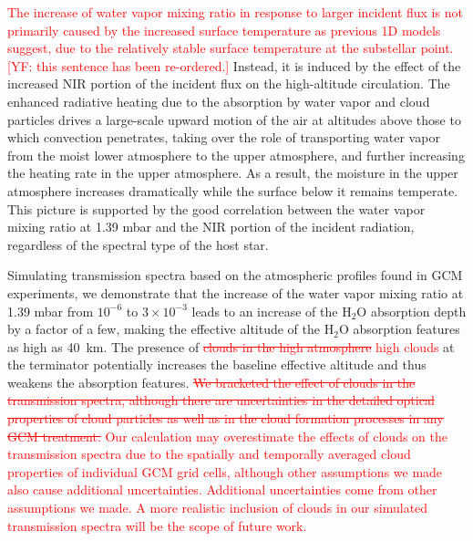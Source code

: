 \documentclass[11pt,numberedappendix,twocolappendix,]{emulateapj}
\def\water{H$_2$O}
\def\preslevel{1.39 mbar}
\def\wv{water vapor}
\def\addYF#1{\textcolor{red}{#1}}
\def\changeYF#1#2{\textcolor{red}{\sout{#1} #2}}
\begin{document}
\addYF{The increase of \wv{} mixing ratio in response to larger incident flux is not primarily caused by the increased surface temperature as previous 1D models suggest, due to the relatively stable surface temperature at the substellar point. }\addYF{[YF: this sentence has been re-ordered.]}
Instead, it is induced by the effect of the increased NIR portion of the incident flux on the high-altitude circulation. 
The enhanced radiative heating due to the absorption by \wv{} and cloud particles drives a large-scale upward motion of the air at altitudes above those to which convection penetrates, taking over the role of transporting \wv{} from the moist lower atmosphere to the upper atmosphere, and further increasing the heating rate in the upper atmosphere.
As a result, the moisture in the upper atmosphere increases dramatically while the surface below it remains temperate. 
This picture is supported by the good correlation between the \wv{} mixing ratio at \preslevel{} and the NIR portion of the incident radiation, regardless of the spectral type of the host star. 

Simulating transmission spectra based on the atmospheric profiles found in GCM experiments, 
we demonstrate that the increase of the \wv{} mixing ratio at \preslevel{} from $10^{-6}$ to $3 \times 10^{-3}$ leads to an increase of the \water{} absorption depth by a factor of a few, making the effective altitude of the \water{} absorption features as high as 40~km. 
The presence of \changeYF{clouds in the high atmosphere}{high clouds} at the terminator potentially increases the baseline effective altitude and thus weakens the absorption features. 
\changeYF{We bracketed the effect of clouds in the transmission spectra, 
although there are uncertainties in the detailed optical properties of cloud particles as well as in the cloud formation processes in any GCM treatment.}{Our calculation may overestimate the effects of clouds on the transmission spectra due to the spatially and temporally averaged cloud properties of individual GCM grid cells, although other assumptions we made also cause additional uncertainties. Additional uncertainties come from other assumptions we made. 
A more realistic inclusion of clouds in our simulated transmission spectra will be the scope of future work. } 
\end{document}
